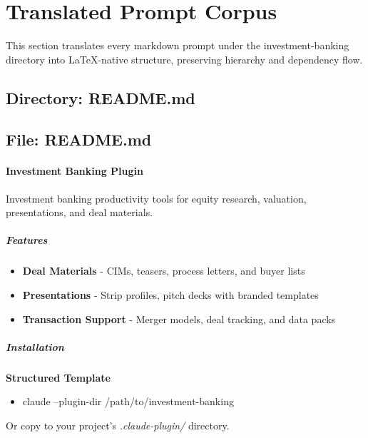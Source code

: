\documentclass[11pt]{article}
\begin{document}
\newpage

\section{Translated Prompt Corpus}

This section translates every markdown prompt under the investment-banking directory into LaTeX-native structure, preserving hierarchy and dependency flow.

\subsection{Directory: README.md}

\subsection{File: README.md}\label{file:README.md}

\paragraph{Investment Banking Plugin}\mbox{}\par

Investment banking productivity tools for equity research, valuation, presentations, and deal materials.


\subparagraph{Features}\mbox{}\par

\begin{itemize}[leftmargin=*,itemsep=2pt,topsep=2pt]
\item {} \textbf{Deal Materials} - CIMs, teasers, process letters, and buyer lists
\item {} \textbf{Presentations} - Strip profiles, pitch decks with branded templates
\item {} \textbf{Transaction Support} - Merger models, deal tracking, and data packs
\end{itemize}

\subparagraph{Installation}\mbox{}\par

\textbf{Structured Template}
\begin{itemize}[leftmargin=*,itemsep=2pt,topsep=2pt]
\item {} claude --plugin-dir /path/to/investment-banking
\end{itemize}

Or copy to your project's \emph{.claude-plugin/} directory.
\end{document}
